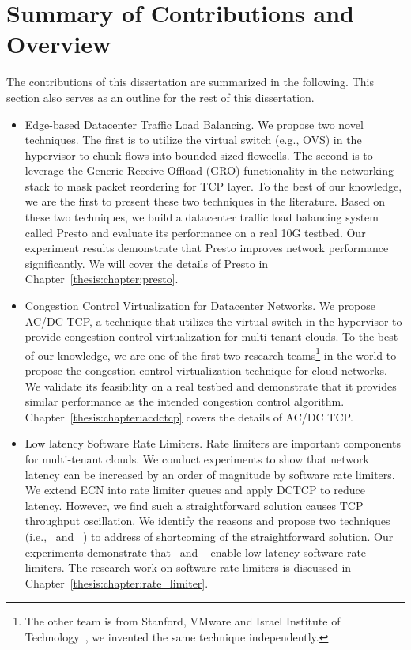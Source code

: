 \section{Summary of Contributions and Overview}

The contributions of this dissertation are summarized in the following. 
This section also serves as an outline for the rest of this dissertation.

\begin{itemize}
\item Edge-based Datacenter Traffic Load Balancing. We propose two novel techniques. 
The first is to utilize the virtual switch (e.g., OVS) in the hypervisor to chunk flows into bounded-sized flowcells. 
The second is to leverage the Generic Receive Offload (GRO) functionality in the networking stack to 
mask packet reordering for TCP layer. To the best of our knowledge, we are the first to 
present these two techniques in the literature. Based on these two techniques, we build a datacenter 
traffic load balancing system called Presto and evaluate its performance on a real 10G testbed. 
Our experiment results demonstrate that Presto improves network performance significantly. 
We will cover the details of Presto in Chapter~\ref{thesis:chapter:presto}.
 
\item Congestion Control Virtualization for Datacenter Networks. 
We propose AC/DC TCP, a technique that utilizes the virtual switch in the hypervisor 
to provide congestion control virtualization for multi-tenant clouds. 
To the best of our knowledge, we are one of the first two research teams\footnote{The other team is from 
Stanford, VMware and Israel Institute of Technology~\cite{vcc}, we invented the same technique independently.} in the world to 
propose the congestion control virtualization technique for cloud networks. 
We validate its feasibility on a real testbed and demonstrate that it provides similar 
performance as the intended congestion control algorithm. Chapter~\ref{thesis:chapter:acdctcp} covers the details of AC/DC TCP.
 
\item Low latency Software Rate Limiters. Rate limiters are important 
components for multi-tenant clouds. We conduct experiments to show that network latency 
can be increased by an order of magnitude by software rate limiters. We extend ECN into rate 
limiter queues and apply DCTCP to reduce latency. However, we find such a straightforward 
solution causes TCP throughput oscillation. We identify the reasons and propose 
two techniques (i.e.,~\dem{} and ~\spring{}) to address of shortcoming of the 
straightforward solution. Our experiments demonstrate that~\dem{} and ~\spring{} enable 
low latency software rate limiters. The research work on software rate limiters is 
discussed in Chapter~\ref{thesis:chapter:rate_limiter}.


\end{itemize}
